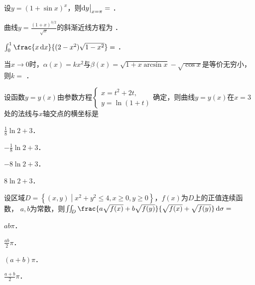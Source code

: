 \documentclass[plain,noanswer,medmath]{../../template/jnuexam}
\begin{document}






\begin{problem}
设$y = (1 + \sin x)^x$，则$\mathop{}\!\mathrm{d} y\big|_{x = \pi} =$ \fillin{}．
\end{problem}


\begin{problem}
曲线$y = \frac{(1 + x)^{3/2}}{\sqrt{x}}$的斜渐近线方程为 \fillin{}．
\end{problem}


\begin{problem}
$\int_0^1 \frac{x\dx}{(2 - x^2)\sqrt{1 - x^2}} =$ \fillin{}．
\end{problem}




\begin{problem}
当$x \to 0$时，$\alpha (x) = kx^2$与$\beta (x) = \sqrt{1 + x\arcsin x} - \sqrt{\cos x}$是等价无穷小，
则$k =$ \fillin{}．
\end{problem}










\begin{problem}
设函数$y = y(x)$由参数方程$\begin{cases}
  x = t^2 + 2t, \\
  y = \ln(1 + t)
\end{cases}$确定，则曲线$y = y(x)$在$x = 3$处的法线与$x$轴交点的横坐标是\pickout{}
\begin{abcd}
\item $\frac{1}{8}\ln 2 + 3$．
\item $- \frac{1}{8}\ln 2 + 3$．
\item $- 8\ln 2 + 3$．
\item $8\ln 2 + 3$．
\end{abcd}
\end{problem}


\begin{problem}
设区域$D = \left\{(x,y) \middle| x^2 + y^2 \le 4,x \ge 0,y \ge 0 \right\}$，$f(x)$为$D$上的正值连续函数，
$a,b$为常数，则$\iint_D \frac{a\sqrt{f(x)} + b\sqrt{f(y)}}{\sqrt{f(x)} + \sqrt{f(y)}} \d\sigma=$\pickout{}
\begin{abcd}
\item $ab\pi$．
\item $\frac{ab}{2}\pi$．
\item $(a + b)\pi$．
\item $\frac{a + b}{2}\pi$．
\end{abcd}
\end{problem}
\end{document}

